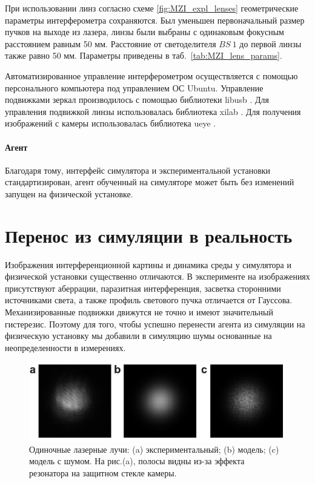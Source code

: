 При использовании линз согласно схеме \ref{fig:MZI_expl_lenses} геометрические параметры интерферометра сохраняются. Был уменьшен первоначальный размер пучков на выходе из лазера, линзы были выбраны с одинаковым фокусным расстоянием равным 50 мм. Расстояние от светоделителя $BS\ 1$ до первой линзы также равно 50 мм. Параметры приведены в таб.~\ref{tab:MZI_lens_params}. 


Автоматизированное управление интерферометром осуществляется с помощью персонального компьютера под управлением ОС Ubuntu. Управление подвижками зеркал производилось с помощью библиотеки libusb \cite{libusb}. Для управления подвижкой линзы использовалась библиотека xilab \cite{standa_soft}. Для получения изображений с камеры использовалась библиотека ueye \cite{ids_soft}. 


\paragraph{Агент}

Благодаря тому, интерфейс симулятора и экспериментальной установки стандартизирован, агент обученный на симуляторе может быть без изменений запущен на физической установке. 


\section{Перенос из симуляции в реальность}\label{sec:ch2/sec6}

Изображения интерференционной картины и динамика среды у симулятора и физической установки существенно отличаются. В эксперименте на изображениях присутствуют аберрации, паразитная интерференция, засветка сторонними источниками света, а также профиль светового пучка отличается от Гауссова. Механизированные подвижки движутся не точно и имеют значительный гистерезис. Поэтому для того, чтобы успешно перенести агента из симуляции на физическую установку  мы добавили в симуляцию шумы основанные на неопределенности в измерениях.

\begin{figure}
\centering
  \includegraphics[width=0.8\linewidth]{images/beamsamples.pdf}

\caption{Одиночные лазерные лучи: (a) экспериментальный; (b) модель; (c) модель с шумом. На рис.(a), полосы видны из-за эффекта резонатора на защитном стекле камеры.}
\label{fig:rad_fit}
\end{figure}



